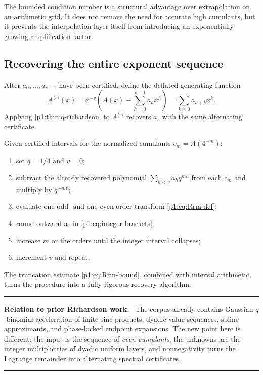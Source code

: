 \documentclass[11pt,oneside]{article}
\numberwithin{equation}{section}
\theoremstyle{definition}
\theoremstyle{remark}
\newenvironment{statusbox}[1]{%
  \par\medskip\noindent\begin{center}\begin{minipage}{0.94\textwidth}%
  \color{linkblue}\hrule\vspace{0.65em}%
  \color{black}\textbf{\color{linkblue}#1.}\ }{%
  \par\vspace{0.65em}\color{linkblue}\hrule
  \end{minipage}\end{center}\medskip}
\begin{document}
\begin{remark}
The bounded condition number is a structural advantage over extrapolation on an arithmetic
grid.  It does not remove the need for accurate high cumulants, but it prevents the
interpolation layer itself from introducing an exponentially growing amplification factor.
\end{remark}

\subsection{Recovering the entire exponent sequence}

After $a_0,\ldots,a_{v-1}$ have been certified, define the deflated generating function
\begin{equation}
 A^{\langle v\rangle}(x)
 =x^{-v}\left(A(x)-\sum_{h=0}^{v-1}a_hx^h\right)
 =\sum_{k\ge0}a_{v+k}x^k.
 \label{p1:eq:deflated-A}
\end{equation}
Applying \cref{p1:thm:q-richardson} to $A^{\langle v\rangle}$ recovers $a_v$ with the same
alternating certificate.

\begin{algorithm}
\label{p1:alg:tomography}
Given certified intervals for the normalized cumulants $c_m=A(4^{-m})$:
\begin{enumerate}
\item set $q=1/4$ and $v=0$;
\item subtract the already recovered polynomial
      $\sum_{h<v}a_hq^{mh}$ from each $c_m$ and multiply by $q^{-mv}$;
\item evaluate one odd- and one even-order transform \eqref{p1:eq:Rrm-def};
\item round outward as in \eqref{p1:eq:integer-brackets};
\item increase $m$ or the orders until the integer interval collapses;
\item increment $v$ and repeat.
\end{enumerate}
The truncation estimate \eqref{p1:eq:Rrm-bound}, combined with interval arithmetic, turns the
procedure into a fully rigorous recovery algorithm.
\end{algorithm}

\begin{statusbox}{Relation to prior Richardson work}
The corpus already contains Gaussian-$q$-binomial acceleration of finite sinc products,
dyadic value sequences, spline approximants, and phase-locked endpoint expansions.  The new
point here is different: the input is the sequence of \emph{even cumulants}, the unknowns are
the integer multiplicities of dyadic uniform layers, and nonnegativity turns the Lagrange
remainder into alternating spectral certificates.
\end{statusbox}
\end{document}
